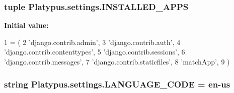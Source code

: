\subsubsection[{I\+N\+S\+T\+A\+L\+L\+E\+D\+\_\+\+A\+P\+P\+S}]{\setlength{\rightskip}{0pt plus 5cm}tuple Platypus.\+settings.\+I\+N\+S\+T\+A\+L\+L\+E\+D\+\_\+\+A\+P\+P\+S}\label{namespace_platypus_1_1settings_a987c3c31e79426162bba4a525f150839}
{\bfseries Initial value\+:}
\begin{DoxyCode}
1 = (
2     \textcolor{stringliteral}{'django.contrib.admin'},
3     \textcolor{stringliteral}{'django.contrib.auth'},
4     \textcolor{stringliteral}{'django.contrib.contenttypes'},
5     \textcolor{stringliteral}{'django.contrib.sessions'},
6     \textcolor{stringliteral}{'django.contrib.messages'},
7     \textcolor{stringliteral}{'django.contrib.staticfiles'},
8     \textcolor{stringliteral}{'matchApp'},
9 )
\end{DoxyCode}
\subsubsection[{L\+A\+N\+G\+U\+A\+G\+E\+\_\+\+C\+O\+D\+E}]{\setlength{\rightskip}{0pt plus 5cm}string Platypus.\+settings.\+L\+A\+N\+G\+U\+A\+G\+E\+\_\+\+C\+O\+D\+E = \textquotesingle{}en-\/us\textquotesingle{}}\label{namespace_platypus_1_1settings_a0cb66ded6846c00b50227be07adf9ace}
